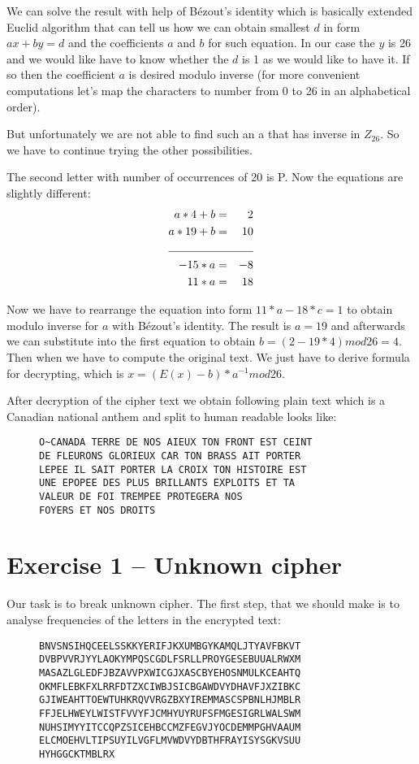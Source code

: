 \documentclass[a4paper,10pt]{article}
\begin{document}
\noindent
We can solve the result with help of Bézout's identity which is basically extended Euclid algorithm that can tell us how we can obtain smallest $d$ in form $ ax + by = d$ and the coefficients $a$ and $b$ for such equation. In our case the $y$ is 26 and we would like have to know whether the $d$ is 1 as we would like to have it. If so then the coefficient $a$ is desired modulo inverse (for more convenient computations let's map the characters to number from 0 to 26 in an alphabetical order).

\noindent
But unfortunately we are not able to find such an a that has inverse in $Z_{26}$. So we have to continue trying the other possibilities.

\bigskip
\noindent
The second letter with number of occurrences of 20 is P.
Now the equations are slightly different:
\begin{eqnarray*}
a * 4 + b &=& 2\\
a * 19 + b &=& 10\\
\cline{1-3}
-15*a &=& -8\\
11*a &=& 18
\end{eqnarray*}

\noindent
Now we have to rearrange the equation into form $11*a - 18*c = 1$ to obtain modulo inverse for $a$ with Bézout's identity. The result is $a=19$ and afterwards we can substitute into the first equation to obtain $b=(2 - 19*4) mod 26=4$. Then when we have to compute the original text. We just have to derive formula for decrypting, which is $x = (E(x) -  b)* a^{-1} mod 26$.

\noindent
After decryption of the cipher text we obtain following plain text which is a Canadian national anthem and split to human readable looks like:
\begin{figure}[h]
\centering
\begin{BVerbatim}
O~CANADA TERRE DE NOS AIEUX TON FRONT EST CEINT
DE FLEURONS GLORIEUX CAR TON BRASS AIT PORTER 
LEPEE IL SAIT PORTER LA CROIX TON HISTOIRE EST
UNE EPOPEE DES PLUS BRILLANTS EXPLOITS ET TA 
VALEUR DE FOI TREMPEE PROTEGERA NOS
FOYERS ET NOS DROITS
\end{BVerbatim}
\end{figure}

\section*{Exercise 1 -- Unknown cipher}
Our task is to break unknown cipher. The first step, that we should make is to analyse frequencies of the letters in the encrypted text:
\begin{figure}[h]
\centering
\begin{BVerbatim}
BNVSNSIHQCEELSSKKYERIFJKXUMBGYKAMQLJTYAVFBKVT
DVBPVVRJYYLAOKYMPQSCGDLFSRLLPROYGESEBUUALRWXM
MASAZLGLEDFJBZAVVPXWICGJXASCBYEHOSNMULKCEAHTQ
OKMFLEBKFXLRRFDTZXCIWBJSICBGAWDVYDHAVFJXZIBKC
GJIWEAHTTOEWTUHKRQVVRGZBXYIREMMASCSPBNLHJMBLR
FFJELHWEYLWISTFVVYFJCMHYUYRUFSFMGESIGRLWALSWM
NUHSIMYYITCCQPZSICEHBCCMZFEGVJYOCDEMMPGHVAAUM
ELCMOEHVLTIPSUYILVGFLMVWDVYDBTHFRAYISYSGKVSUU
HYHGGCKTMBLRX
\end{BVerbatim}
\end{figure}
\end{document}
